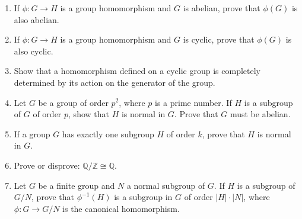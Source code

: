 {\begin{enumerate}
 

 
\item
If $\phi : G \rightarrow H$ is a group homomorphism and $G$ is
abelian, prove that $\phi(G)$ is also abelian. 
 
 
\item
If $\phi : G \rightarrow H$ is a group homomorphism and $G$ is cyclic,
prove that $\phi(G)$ is also cyclic. 
 
 
\item
Show that a homomorphism defined on a cyclic group is completely
determined by its action on the generator of the group.


 
 
\item
Let $G$ be a group of order $p^2$, where $p$ is a prime number. If $H$
is a subgroup of $G$ of order $p$, show that $H$ is normal in $G$.
Prove that $G$ must be abelian. 
 
 
\item
If a group $G$ has exactly one subgroup $H$ of order $k$, prove that
$H$ is normal in $G$. 
 
 
\item
Prove or disprove: ${\mathbb Q} / {\mathbb Z} \cong {\mathbb Q}$.
 
 
% 
% 
% 
% 
% 
% 
% 
% 
 
\item
Let $G$ be a finite group and $N$ a normal subgroup of $G$. If $H$ is
a subgroup of $G/N$, prove that $\phi^{-1}(H)$ is a subgroup in $G$ of
order $|H| \cdot |N|$, where $\phi : G \rightarrow G/N$ is the
canonical homomorphism. 
 

\end{enumerate}}
